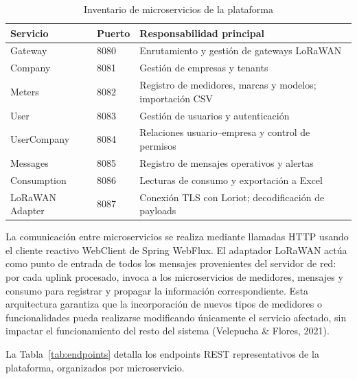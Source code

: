 \documentclass[12pt,a4paper,oneside]{report}
\begin{document}
\begin{table}[H]
\caption{Inventario de microservicios de la plataforma}
\label{tab:microservicios}
\centering
\begin{tabular}{llp{7cm}}
\toprule
\textbf{Servicio} & \textbf{Puerto} & \textbf{Responsabilidad principal} \\
\midrule
Gateway & 8080 & Enrutamiento y gestión de gateways LoRaWAN \\
Company & 8081 & Gestión de empresas y tenants \\
Meters & 8082 & Registro de medidores, marcas y modelos; importación CSV \\
User & 8083 & Gestión de usuarios y autenticación \\
UserCompany & 8084 & Relaciones usuario--empresa y control de permisos \\
Messages & 8085 & Registro de mensajes operativos y alertas \\
Consumption & 8086 & Lecturas de consumo y exportación a Excel \\
LoRaWAN Adapter & 8087 & Conexión TLS con Loriot; decodificación de payloads \\
\bottomrule
\end{tabular}
\end{table}

La comunicación entre microservicios se realiza mediante llamadas HTTP usando el cliente reactivo WebClient de Spring WebFlux. El adaptador LoRaWAN actúa como punto de entrada de todos los mensajes provenientes del servidor de red: por cada uplink procesado, invoca a los microservicios de medidores, mensajes y consumo para registrar y propagar la información correspondiente. Esta arquitectura garantiza que la incorporación de nuevos tipos de medidores o funcionalidades pueda realizarse modificando únicamente el servicio afectado, sin impactar el funcionamiento del resto del sistema (Velepucha \& Flores, 2021).

La Tabla~\ref{tab:endpoints} detalla los endpoints REST representativos de la plataforma, organizados por microservicio.
\end{document}
